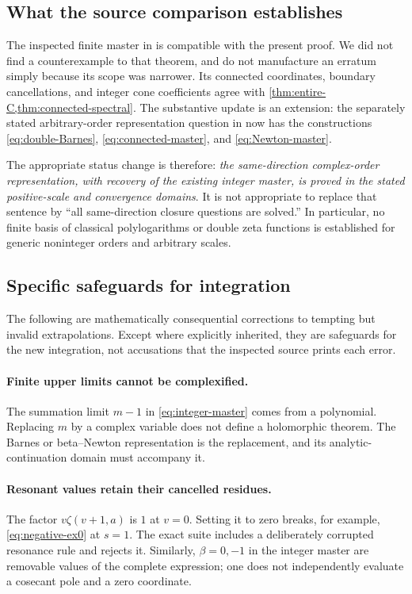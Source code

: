 \documentclass[11pt]{article}
\numberwithin{equation}{section}
\theoremstyle{definition}
\begin{document}
\subsection{What the source comparison establishes}
The inspected finite master in \cite{BMH} is compatible with the present proof. We did not find a counterexample to that theorem, and do not manufacture an erratum simply because its scope was narrower. Its connected coordinates, boundary cancellations, and integer cone coefficients agree with \cref{thm:entire-C,thm:connected-spectral}. The substantive update is an extension: the separately stated arbitrary-order representation question in \cite{RLC} now has the constructions \eqref{eq:double-Barnes}, \eqref{eq:connected-master}, and \eqref{eq:Newton-master}.

The appropriate status change is therefore: \emph{the same-direction complex-order representation, with recovery of the existing integer master, is proved in the stated positive-scale and convergence domains}. It is not appropriate to replace that sentence by ``all same-direction closure questions are solved.'' In particular, no finite basis of classical polylogarithms or double zeta functions is established for generic noninteger orders and arbitrary scales.

\subsection{Specific safeguards for integration}
The following are mathematically consequential corrections to tempting but invalid extrapolations. Except where explicitly inherited, they are safeguards for the new integration, not accusations that the inspected source prints each error.

\paragraph{Finite upper limits cannot be complexified.}
The summation limit $m-1$ in \eqref{eq:integer-master} comes from a polynomial. Replacing $m$ by a complex variable does not define a holomorphic theorem. The Barnes or beta--Newton representation is the replacement, and its analytic-continuation domain must accompany it.

\paragraph{Resonant values retain their cancelled residues.}
The factor $v\zeta(v+1,a)$ is $1$ at $v=0$. Setting it to zero breaks, for example, \eqref{eq:negative-ex0} at $s=1$. The exact suite includes a deliberately corrupted resonance rule and rejects it. Similarly, $\beta=0,-1$ in the integer master are removable values of the complete expression; one does not independently evaluate a cosecant pole and a zero coordinate.
\end{document}
